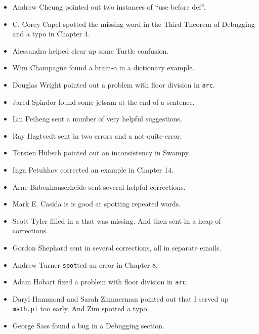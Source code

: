 \begin{itemize}
\item Andrew Cheung pointed out two instances of ``use before def''.

\item C. Corey Capel spotted the missing word in the Third Theorem
of Debugging and a typo in Chapter 4.

\item Alessandra helped clear up some Turtle confusion.

\item Wim Champagne found a brain-o in a dictionary example.

\item Douglas Wright pointed out a problem with floor division in
{\tt arc}.

\item Jared Spindor found some jetsam at the end of a sentence.

\item Lin Peiheng sent a number of very helpful suggestions.

\item Ray Hagtvedt sent in two errors and a not-quite-error.

\item Torsten H\"{u}bsch pointed out an inconsistency in Swampy.

\item Inga Petuhhov corrected an example in Chapter 14.

\item Arne Babenhauserheide sent several helpful corrections.

\item Mark E. Casida is is good at spotting repeated words.

\item Scott Tyler filled in a that was missing.  And then sent in
a heap of corrections.

\item Gordon Shephard sent in several corrections, all in separate
emails.

\item Andrew Turner {\tt spot}ted an error in Chapter 8.

\item Adam Hobart fixed a problem with floor division in {\tt arc}.

\item Daryl Hammond and Sarah Zimmerman pointed out that I served
up {\tt math.pi} too early.  And Zim spotted a typo.

\item George Sass found a bug in a Debugging section.


\end{itemize}
